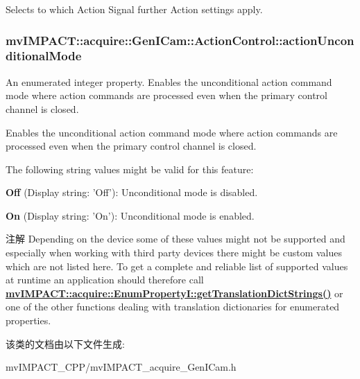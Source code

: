 Selects to which Action Signal further Action settings apply. \hypertarget{classmv_i_m_p_a_c_t_1_1acquire_1_1_gen_i_cam_1_1_action_control_a80144bc0580fb0e00e2658f0a6176d16}{
\subsubsection[{action\+Unconditional\+Mode}]{ mv\+I\+M\+P\+A\+C\+T\+::acquire\+::\+Gen\+I\+Cam\+::\+Action\+Control\+::action\+Unconditional\+Mode}}\label{classmv_i_m_p_a_c_t_1_1acquire_1_1_gen_i_cam_1_1_action_control_a80144bc0580fb0e00e2658f0a6176d16}


An enumerated integer property. Enables the unconditional action command mode where action commands are processed even when the primary control channel is closed. 

Enables the unconditional action command mode where action commands are processed even when the primary control channel is closed.

The following string values might be valid for this feature\+:
\begin{DoxyItemize}
\item {\bfseries Off} (Display string\+: 'Off')\+: Unconditional mode is disabled.
\item {\bfseries On} (Display string\+: 'On')\+: Unconditional mode is enabled.
\end{DoxyItemize}

\begin{DoxyNote}{注解}
Depending on the device some of these values might not be supported and especially when working with third party devices there might be custom values which are not listed here. To get a complete and reliable list of supported values at runtime an application should therefore call {\bfseries \hyperlink{classmv_i_m_p_a_c_t_1_1acquire_1_1_enum_property_i_a0ba6ccbf5ee69784d5d0b537924d26b6}{mv\+I\+M\+P\+A\+C\+T\+::acquire\+::\+Enum\+Property\+I\+::get\+Translation\+Dict\+Strings()}} or one of the other functions dealing with translation dictionaries for enumerated properties. 
\end{DoxyNote}


该类的文档由以下文件生成\+:\begin{DoxyCompactItemize}
\item 
mv\+I\+M\+P\+A\+C\+T\+\_\+\+C\+P\+P/mv\+I\+M\+P\+A\+C\+T\+\_\+acquire\+\_\+\+Gen\+I\+Cam.\+h\end{DoxyCompactItemize}
